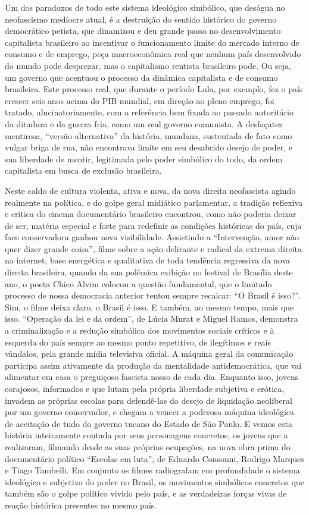 Um dos paradoxos de todo este sistema ideológico simbólico, que deságua
no neofascismo medíocre atual, é a destruição do sentido histórico do
governo democrático petista, que dinamizou e deu grande passo no
desenvolvimento capitalista brasileiro ao incentivar o funcionamento
limite do mercado interno de consumo e de emprego, peça macroeconômica
real que nenhum país desenvolvido do mundo pode desprezar, mas o
capitalismo rentista brasileiro pode. Ou seja, um governo que acentuou o
processo da dinâmica capitalista e de consumo brasileira. Este processo
real, que durante o período Lula, por exemplo, fez o país crescer seis
anos acima do PIB mundial, em direção ao pleno emprego, foi tratado,
alucinatoriamente, com a referência bem fixada ao passado autoritário da
ditadura e da guerra fria, como um real governo comunista. A desfaçatez
mentirosa, ``versão alternativa'' da história, mundana, sustentada de
fato como vulgar briga de rua, não encontrava limite em seu desabrido
desejo de poder, e sua liberdade de mentir, legitimada pelo poder
simbólico do todo, da ordem capitalista em busca de exclusão brasileira.

Neste caldo de cultura violenta, ativa e nova, da nova direita
neofascista agindo realmente na política, e do golpe geral midiático
parlamentar, a tradição reflexiva e crítica do cinema documentário
brasileiro encontrou, como não poderia deixar de ser, matéria especial e
forte para redefinir as condições históricas do país, cuja face
conservadora ganhou nova visibilidade. Assistindo a ``Intervenção, amor
não quer dizer grande coisa'', filme sobre a ação delirante e radical da
extrema direita na internet, base energética e qualitativa de toda
tendência regressiva da nova direita brasileira, quando da sua polêmica
exibição no festival de Brasília deste ano, o poeta Chico Alvim colocou
a questão fundamental, que o limitado processo de nossa democracia
anterior tentou sempre recalcar: ``O Brasil é isso?''. Sim, o filme
deixa claro, o Brasil é isso. E também, ao mesmo tempo, mais que isso.
``Operação da lei e da ordem'', de Lúcia Murat e Miguel Ramos, demonstra
a criminalização e a redução simbólica dos movimentos sociais críticos e
à esquerda do país sempre ao mesmo ponto repetitivo, de ilegítimos e
reais vândalos, pela grande mídia televisiva oficial. A máquina geral da
comunicação participa assim ativamente da produção da mentalidade
antidemocrática, que vai alimentar em casa o preguiçoso fascista nosso
de cada dia. Enquanto isso, jovens corajosos, informados e que lutam
pela própria liberdade subjetiva e erótica, invadem as próprias escolas
para defendê-las do desejo de liquidação neoliberal por um governo
conservador, e chegam a vencer a poderosa máquina ideológica de
aceitação de tudo do governo tucano do Estado de São Paulo. E vemos esta
história inteiramente contada por seus personagens concretos, os jovens
que a realizaram, filmando desde as suas próprias ocupações, na nova
obra prima do documentário político ``Escolas em luta'', de Eduardo
Consonni, Rodrigo Marques e Tiago Tambelli. Em conjunto os filmes
radiografam em profundidade o sistema ideológico e subjetivo do poder no
Brasil, os movimentos simbólicos concretos que também são o golpe
político vivido pelo país, e as verdadeiras forças vivas de reação
histórica presentes no mesmo país.


